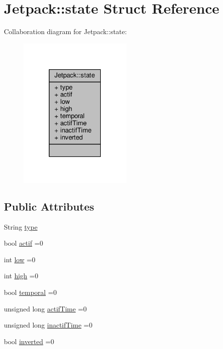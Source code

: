 \hypertarget{structJetpack_1_1state}{}\section{Jetpack\+:\+:state Struct Reference}
\label{structJetpack_1_1state}


Collaboration diagram for Jetpack\+:\+:state\+:
\nopagebreak
\begin{figure}[H]
\begin{center}
\leavevmode
\includegraphics[width=159pt]{structJetpack_1_1state__coll__graph}
\end{center}
\end{figure}
\subsection*{Public Attributes}
\begin{DoxyCompactItemize}
\item 
String \hyperlink{structJetpack_1_1state_a9143580871c2e573fb502bb94c1da8e5}{type}
\item 
bool \hyperlink{structJetpack_1_1state_aa177541689bbaea21a4650a083b0df77}{actif} =0
\item 
int \hyperlink{structJetpack_1_1state_ace3ecd2b1f262756d8f7a8adda20136a}{low} =0
\item 
int \hyperlink{structJetpack_1_1state_a54cc9291c7cc30102a07fd2b0ccd8dde}{high} =0
\item 
bool \hyperlink{structJetpack_1_1state_abd6039e7a48856550b0ffbf8bcff7bdd}{temporal} =0
\item 
unsigned long \hyperlink{structJetpack_1_1state_af2e1cc323ef9ffcc3cf4d203f85d726b}{actif\+Time} =0
\item 
unsigned long \hyperlink{structJetpack_1_1state_aaf817b1f9e7a4d65b9e3ca4726b281f6}{inactif\+Time} =0
\item 
bool \hyperlink{structJetpack_1_1state_a6bc03bb8f05b10aa142dbb0c39c87fb5}{inverted} =0
\end{DoxyCompactItemize}


